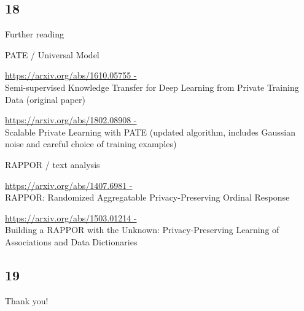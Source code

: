 \documentclass[xor=table]{beamer}
\def\itemsymbol{\textbullet}
\let\svpar\par
\let\svitemize\itemize
\let\svenditemize\enditemize
\let\svitem\item
\let\svcenter\center
\let\svendcenter\endcenter
\let\svcolumn\column
\let\svendcolumn\endcolumn
\def\newitem{\renewcommand\item[1][\itemsymbol]{\vfill\svitem[##1]}}%
\def\newpar{\def\par{\svpar\vfill}}%
\newcommand\stretchon{%
  \newpar%
  \renewcommand\item[1][\itemsymbol]{\svitem[##1]\newitem}%
  \renewenvironment{itemize}%
    {\svitemize}{\svenditemize\newpar\par}%
  \renewenvironment{center}%
    {\svcenter\newpar}{\svendcenter\newpar}%
  \renewenvironment{column}[2]%
    {\svcolumn{##1}\setlength{\parskip}{\columnskip}##2}%
    {\svendcolumn\vspace{\columnskip}}%
}
\begin{document}







\subsection*{18}
\stretchon
\begin{frame}{Further reading}

\begin{multicols}{2}
\begin{itemize}

\item PATE / Universal Model
\medskip
\item {\footnotesize \url{https://arxiv.org/abs/1610.05755 -}}\\ Semi-supervised Knowledge Transfer for Deep Learning from Private Training Data (original paper)
\medskip
\item {\footnotesize \url{https://arxiv.org/abs/1802.08908 -}}\\
 Scalable Private Learning with PATE (updated algorithm, includes Gaussian noise and careful choice of training examples)


\end{itemize}

\columnbreak

\begin{itemize}
\item RAPPOR / text analysis
\medskip
\item {\footnotesize \url{https://arxiv.org/abs/1407.6981 -}}\\
 RAPPOR: Randomized Aggregatable Privacy-Preserving Ordinal Response
\medskip
\item {\footnotesize \url{https://arxiv.org/abs/1503.01214 -}\\}
 Building a RAPPOR with the Unknown: Privacy-Preserving Learning of Associations and Data Dictionaries

\end{itemize}

\end{multicols}
\end{frame}



\subsection*{19}
\stretchon
\begin{frame}{Thank you!}
\end{frame}
\end{document}
